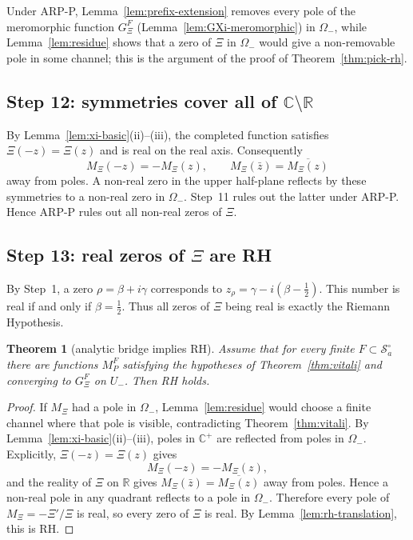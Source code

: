 \documentclass[11pt]{amsart}
\newtheorem{theorem}{Theorem}[section]
\theoremstyle{definition}
\theoremstyle{remark}
\theoremstyle{definition}
\newcommand{\half}{\tfrac{1}{2}}
\newcommand{\cS}{\mathcal{S}}
\newcommand{\R}{\mathbb{R}}
\newcommand{\C}{\mathbb{C}}
\newcommand{\GXi}{G_\Xi}
\begin{document}
Under ARP-P, Lemma~\ref{lem:prefix-extension} removes every pole of the meromorphic function $\GXi^F$
(Lemma~\ref{lem:GXi-meromorphic}) in $\Omega_-$, while Lemma~\ref{lem:residue} shows that a zero of $\Xi$
in $\Omega_-$ would give a non-removable pole in some channel; this is the argument of the proof of
Theorem~\ref{thm:pick-rh}.

\subsection{Step 12: symmetries cover all of \texorpdfstring{$\C\setminus\R$}{C minus R}}

By Lemma~\ref{lem:xi-basic}(ii)--(iii), the completed function satisfies $\Xi(-z)=\Xi(z)$ and is real on
the real axis.  Consequently
\[
   M_\Xi(-z)=-M_\Xi(z),\qquad
   M_\Xi(\bar z)=\overline{M_\Xi(z)}
\]
away from poles.  A non-real zero in the upper half-plane reflects by these symmetries to a non-real zero
in $\Omega_-$.  Step~11 rules out the latter under ARP-P.  Hence ARP-P rules out all non-real zeros of
$\Xi$.

\subsection{Step 13: real zeros of \texorpdfstring{$\Xi$}{Xi} are RH}

By Step~1, a zero $\rho=\beta+i\gamma$ corresponds to $z_\rho=\gamma-i(\beta-\half)$.  This number is
real if and only if $\beta=\half$.  Thus all zeros of $\Xi$ being real is exactly the Riemann Hypothesis.


\begin{theorem}[analytic bridge implies RH]\label{thm:bridge-rh}
Assume that for every finite $F\subset\cS_a^\circ$ there are functions $M_P^F$ satisfying the hypotheses
of Theorem~\ref{thm:vitali} and converging to $\GXi^F$ on $U_-$.  Then RH holds.
\end{theorem}

\begin{proof}
If $M_\Xi$ had a pole in $\Omega_-$, Lemma~\ref{lem:residue} would choose a finite channel where that pole
is visible, contradicting Theorem~\ref{thm:vitali}.  By Lemma~\ref{lem:xi-basic}(ii)--(iii), poles in
$\C^+$ are reflected from poles in $\Omega_-$.  Explicitly, $\Xi(-z)=\Xi(z)$ gives
\[
   M_\Xi(-z)=-M_\Xi(z),
\]
and the reality of $\Xi$ on $\R$ gives $M_\Xi(\bar z)=\overline{M_\Xi(z)}$ away from poles.  Hence a
non-real pole in any quadrant reflects to a pole in $\Omega_-$.  Therefore every pole of
$M_\Xi=-\Xi'/\Xi$ is real, so every zero of $\Xi$ is real.  By Lemma~\ref{lem:rh-translation}, this is
RH.
\end{proof}
\end{document}
